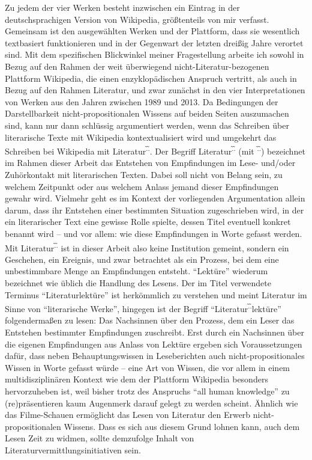 \documentclass[fontsize=12pt]{scrartcl}
\begin{document}
Zu jedem der \mbox{vier} Werken be\-steht inzwischen ein Eintrag in der deutschspra\-chi\-gen Version von Wi\-ki\-pe\-dia, gr\"o{\ss}tenteils von mir verfasst. Gemeinsam ist den ausgew\"ahlten Werken und der Plattform, dass sie we\-sent\-lich textbasiert funktionieren und in der Gegenwart der letzten drei{\ss}ig Jahre verortet sind. Mit dem spezi\-fi\-schen Blickwinkel meiner Fragestellung arbeite ich sowohl in Bezug auf den Rahmen der weit \"uberwiegend nicht-Li\-te\-ra\-tur-bezogenen Plattform Wi\-ki\-pe\-dia, die einen enzy\-klop\"adischen Anspruch vertritt, als auch in Bezug auf den Rahmen Li\-te\-ra\-tur, und zwar zun\"achst in den \mbox{vier} Interpretationen von Werken aus den Jahren zwi\-schen 1989 und 2013. Da Bedingungen der Darstellbarkeit nicht-pro\-po\-si\-ti\-o\-na\-len Wissens auf beiden Seiten auszumachen sind, kann nur dann schl\"ussig argumentiert werden, wenn das Schrei\-ben \"uber li\-te\-ra\-rische Texte mit Wi\-ki\-pe\-dia kontextualisiert wird und umgekehrt das Schrei\-ben bei Wi\-ki\-pe\-dia mit Li\-te\-ra\-tur\textsuperscript{\~.\~.}. Der Begriff Li\-te\-ra\-tur\textsuperscript{\~.\~.} (mit \textsuperscript{\~.\~.}) be\-zeichnet im Rahmen dieser Arbeit das Entstehen von Emp\-fin\-dun\-gen im Lese- und/oder Zuh\"orkontakt mit li\-te\-ra\-rischen Texten. Dabei soll nicht von Belang sein, zu welchem Zeitpunkt oder aus welchem Anlass jemand dieser Emp\-fin\-dun\-gen gewahr wird. Vielmehr geht es im Kontext der vorliegenden Argumentation allein darum, dass ihr Entstehen einer bestimmten Situation zugeschrieben wird, in der ein li\-te\-ra\-rischer Text eine gewisse Rolle spielte, dessen Titel eventuell konkret benannt wird -- und vor allem: wie diese Emp\-fin\-dun\-gen in Worte gefasst werden. Mit Li\-te\-ra\-tur\-\textsuperscript{\~.\~.} ist in dieser Arbeit also keine Institution gemeint, sondern ein Geschehen, ein Ereignis, und zwar betrachtet als ein Prozess, bei dem eine un\-be\-stimm\-bare Menge an Emp\-fin\-dun\-gen entsteht. "`Lekt\"ure"' wiederum be\-zeichnet wie \"ublich die Handlung des Lesens. Der im Titel verwendete Terminus "`Li\-te\-ra\-tur\-lekt\"ure"' ist herk\"ommlich zu verstehen und meint Li\-te\-ra\-tur im Sinne von "`li\-te\-ra\-rische Werke"', hingegen ist der Begriff "`Li\-te\-ra\-tur\textsuperscript{\~.\~.}\-lekt\"ure"' folgenderma{\ss}en zu lesen: Das Nachsinnen \"uber den Prozess, dem ein Leser\textsuperscript{\tiny *} das Entstehen bestimmter Emp\-fin\-dun\-gen zuschreibt. Erst durch ein Nachsinnen \"uber die eigenen Emp\-fin\-dun\-gen aus Anlass von Lekt\"ure ergeben sich Voraussetzungen daf\"ur, dass neben Behauptungswissen in Leseberichten auch nicht-pro\-po\-si\-ti\-o\-na\-les Wissen in Worte gefasst w\"urde -- eine Art von Wissen, die vor allem in einem multidisziplin\"aren Kontext wie dem der Platt\-form Wi\-ki\-pe\-dia besonders hervorzuheben ist, weil bis\-her trotz des Anspruchs "`all human know\-ledge"' zu (re)pr\"asentieren kaum Augenmerk darauf gelegt zu werden scheint. \"Ahnlich wie das Filme-Schauen erm\"oglicht das Lesen von Li\-te\-ra\-tur den Erwerb nicht-pro\-po\-si\-ti\-o\-na\-len Wissens. Dass es sich aus diesem Grund lohnen kann, auch dem Lesen Zeit zu widmen, sollte demzufolge Inhalt von Li\-te\-ra\-tur\-ver\-mitt\-lungsinitiativen sein. 
\end{document}

